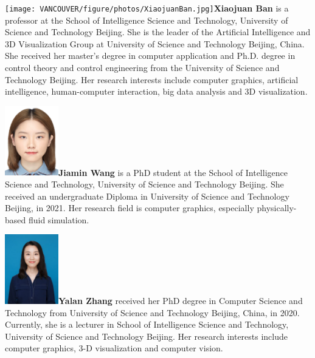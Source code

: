 \documentclass[VANCOUVER,STIX1COL]{WileyNJD-v2}
\begin{document}
\vspace{4.15ex}

\begin{biography}{
\vspace{4ex}
\texttt{[image: VANCOUVER/figure/photos/XiaojuanBan.jpg]}}{\textbf{Xiaojuan Ban} is a professor at the School of Intelligence Science and Technology, University of Science and Technology Beijing. She is the leader of the Artificial Intelligence and 3D Visualization Group at University of Science and Technology Beijing, China. She received her master's degree in computer application and Ph.D. degree in control theory and control engineering from the University of Science and Technology Beijing. Her research interests include computer graphics, artificial intelligence, human-computer interaction, big data analysis and 3D visualization.}
\end{biography}

\begin{biography}{\includegraphics[width=66pt,height=86pt]{VANCOUVER/figure/photos/JiaminWang.jpg}}{\textbf{Jiamin Wang} is a PhD student  at the School of Intelligence Science and Technology, University of Science and Technology Beijing. She received an undergraduate Diploma in University of Science and Technology Beijing, in 2021. Her research field is computer graphics, especially physically-based fluid simulation.}
\end{biography}

\vspace{7ex}

\begin{biography}{\includegraphics[width=66pt,height=86pt]{VANCOUVER/figure/photos/YalanZhang.jpg}}{\textbf{Yalan Zhang} received her PhD degree in Computer Science and Technology from University of Science and Technology Beijing, China, in 2020. Currently, she is a lecturer in School of Intelligence Science and Technology, University of Science and Technology Beijing. Her research interests include computer graphics, 3-D visualization and computer vision.}
\end{biography}
\end{document}
